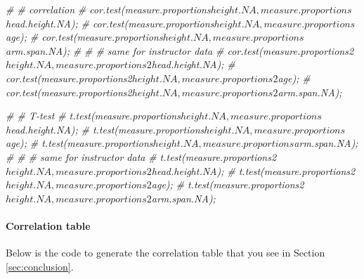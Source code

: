 \documentclass[]{article}
\newenvironment{Shaded}{\begin{snugshade}}{\end{snugshade}}
\newcommand{\CommentTok}[1]{\textcolor[rgb]{0.56,0.35,0.01}{\textit{#1}}}
\begin{document}
\begin{Shaded}
\begin{Highlighting}[]
\CommentTok{\# \# correlation}
\CommentTok{\# cor.test(measure.proportions$height.NA, measure.proportions$head.height.NA);}
\CommentTok{\# cor.test(measure.proportions$height.NA, measure.proportions$age);}
\CommentTok{\# cor.test(measure.proportions$height.NA, measure.proportions$arm.span.NA);}
\CommentTok{\# }
\CommentTok{\# \# same for instructor data}
\CommentTok{\# cor.test(measure.proportions2$height.NA, measure.proportions2$head.height.NA);}
\CommentTok{\# cor.test(measure.proportions2$height.NA, measure.proportions2$age);}
\CommentTok{\# cor.test(measure.proportions2$height.NA, measure.proportions2$arm.span.NA);}


\CommentTok{\# \# T{-}test}
\CommentTok{\# t.test(measure.proportions$height.NA, measure.proportions$head.height.NA);}
\CommentTok{\# t.test(measure.proportions$height.NA, measure.proportions$age);}
\CommentTok{\# t.test(measure.proportions$height.NA, measure.proportions$arm.span.NA);}
\CommentTok{\# }
\CommentTok{\# \# same for instructor data}
\CommentTok{\# t.test(measure.proportions2$height.NA, measure.proportions2$head.height.NA);}
\CommentTok{\# t.test(measure.proportions2$height.NA, measure.proportions2$age);}
\CommentTok{\# t.test(measure.proportions2$height.NA, measure.proportions2$arm.span.NA);}
\end{Highlighting}
\end{Shaded}

\paragraph{Correlation table}
\label{sec:appendix-correlation-table}

Below is the code to generate the correlation table that you see in
Section \ref{sec:conclusion}.
\end{document}
